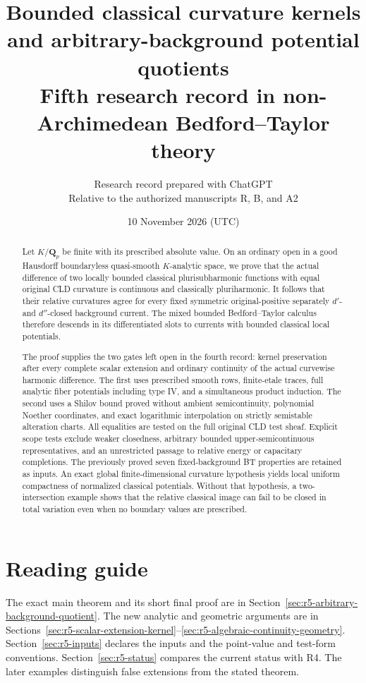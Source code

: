 \documentclass[11pt,a4paper]{article}
\title{Bounded classical curvature kernels\\
and arbitrary-background potential quotients\\[5pt]
\large Fifth research record in non-Archimedean Bedford--Taylor theory}
\author{Research record prepared with ChatGPT\\
\small Relative to the authorized manuscripts R, B, and A2}
\date{10 November 2026 (UTC)}
\numberwithin{equation}{section}
\theoremstyle{definition}
\theoremstyle{remark}
\begin{document}
\maketitle
\begin{abstract}
Let $K/\mathbf Q_p$ be finite with its prescribed absolute value.
On an ordinary open in a good Hausdorff boundaryless quasi-smooth
$K$-analytic space, we prove that the actual difference of two
locally bounded classical plurisubharmonic functions with equal
original CLD curvature is continuous and classically pluriharmonic.
It follows that their relative curvatures agree for every fixed
symmetric original-positive separately $d'$- and $d''$-closed
background current. The mixed bounded Bedford--Taylor calculus
therefore descends in its differentiated slots to currents with
bounded classical local potentials.

The proof supplies the two gates left open in the fourth record:
kernel preservation after every complete scalar extension and
ordinary continuity of the actual curvewise harmonic difference.
The first uses prescribed smooth rows, finite-etale traces, full
analytic fiber potentials including type IV, and a simultaneous
product induction. The second uses a Shilov bound proved without
ambient semicontinuity, polynomial Noether coordinates, and exact
logarithmic interpolation on strictly semistable alteration charts.
All equalities are tested on the full original CLD test sheaf.
Explicit scope tests exclude weaker closedness, arbitrary bounded
upper-semicontinuous representatives, and an unrestricted passage
to relative energy or capacitary completions. The previously
proved seven fixed-background BT properties are retained as inputs.
An exact global finite-dimensional curvature hypothesis yields
local uniform compactness of normalized classical potentials.
Without that hypothesis, a two-intersection example shows that
the relative classical image can fail to be closed in total
variation even when no boundary values are prescribed.
\end{abstract}

\section*{Reading guide}
The exact main theorem and its short final proof are in
Section~\ref{sec:r5-arbitrary-background-quotient}. The new analytic
and geometric arguments are in
Sections~\ref{sec:r5-scalar-extension-kernel}--\ref{sec:r5-algebraic-continuity-geometry}.
Section~\ref{sec:r5-inputs} declares the inputs and the point-value
and test-form conventions. Section~\ref{sec:r5-status} compares the
current status with R4. The later examples distinguish false
extensions from the stated theorem.
\end{document}
